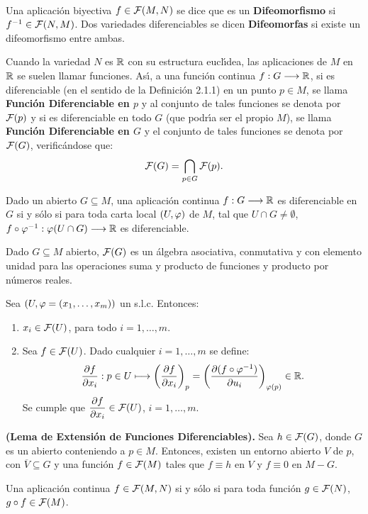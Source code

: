 \documentclass[cursovd_portada.tex]{subfiles}
\begin{document}
\

\begin{defi} Una aplicaci\'{o}n biyectiva $f\in{\cal F}(M,N)$ se dice que es un {\bf Difeomorfismo} si
$f^{-1}\in{\cal F}(N,M)$. Dos variedades diferenciables se dicen
{\bf Difeomorfas} si existe un difeomorfismo entre ambas.
\end{defi}
Cuando la variedad $N$ es $\mathbb{R}$ con su estructura eucl\'{\i}dea, las aplicaciones de $M$ en $\mathbb{R}$ se suelen llamar
funciones. As\'{\i}, a una funci\'{o}n continua $f:G\longrightarrow\mathbb{R}$, si es diferenciable (en el sentido de la Definici\'{o}n 2.1.1) en
un punto $p\in M$, se llama {\bf Funci\'{o}n Diferenciable en $p$} y al conjunto de tales funciones se denota por
${\cal F}(p)$ y si es diferenciable en todo $G$ (que podr\'{\i}a ser el propio $M$), se llama {\bf Funci\'{o}n Diferenciable
en $G$} y el conjunto de tales funciones se denota por ${\cal F}(G)$, verific\'{a}ndose que:
$${\cal F}(G)=\bigcap_{p\in G}{\cal F}(p).$$
\begin{prop}
Dado un abierto $G\subseteq M$, una aplicaci\'{o}n continua $f:G\longrightarrow\mathbb{R}$ es diferenciable en $G$ si y s\'{o}lo si para toda
carta local $(U,\varphi)$ de $M$, tal que $U\cap G\neq\emptyset$, $f\circ\varphi^{-1}:\varphi(U\cap G)\longrightarrow\mathbb{R}$ es diferenciable.
\end{prop}
\begin{prop}
Dado $G\subseteq M$ abierto, ${\cal F}(G)$ es un \'{a}lgebra asociativa, conmutativa y con elemento unidad para las
operaciones suma y producto de funciones y producto por n\'{u}meros reales.
\end{prop}
\begin{ejs}
{\rm Sea $(U,\varphi=(x_1,\dots ,x_m))$ un s.l.c. Entonces:
\begin{enumerate}
\item $x_i\in{\cal F}(U)$, para todo $i=1,\dots ,m$.
\item Sea $f\in{\cal F}(U)$. Dado cualquier $i=1,\dots ,m$ se define:
$$\displaystyle{\frac{\partial f}{\partial x_i}}:p\in U\longmapsto \left(\displaystyle{\frac{\partial f}{\partial x_i}}\right)_p=\left(\displaystyle{\frac{\partial (f\circ\varphi^{-1})}{\partial u_i}}\right)_{\varphi(p)}\in\mathbb{R}.$$
\hs Se cumple que $\displaystyle{\displaystyle{\frac{\partial f}{\partial x_i}}}\in{\cal F}(U)$, $i=1,\dots ,m$.
\end{enumerate}}
\end{ejs}
\begin{prop}
{\bf (Lema de Extensi\'{o}n de Funciones Diferenciables).} Sea $h\in{\cal F}(G)$, donde $G$ es un abierto conteniendo a
$p\in M$. Entonces, existen un entorno abierto $V$ de $p$, con $\overline{V}\subseteq G$ y una funci\'{o}n
$f\in{\cal F}(M)$ tales que $f\equiv h$ en $V$ y $f\equiv 0$ en $M-G$.
\end{prop}
\begin{teorema}
Una aplicaci\'{o}n continua $f\in{\cal F}(M,N)$ si y s\'{o}lo si
para toda funci\'{o}n $g\in{\cal F}(N)$, $g\circ f\in{\cal F}(M)$.
\end{teorema}
\end{document}
